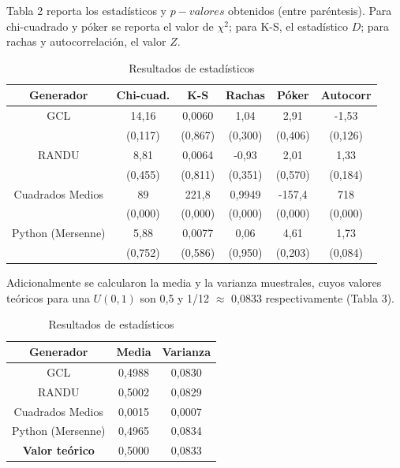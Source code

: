 \documentclass{article}
\begin{document}
Tabla 2 reporta los estadísticos y $p-valores$ obtenidos (entre paréntesis).
Para chi-cuadrado y póker se reporta el valor de $\chi^2$; para K-S, el estadístico $D$; para rachas y autocorrelación, el valor $Z$.

\begin{table}[H]
\begin{center}
\begin{tabular}{ c  c  c  c  c  c }
Generador & Chi-cuad. & K-S & Rachas & Póker & Autocorr \\
\hline
GCL & 14,16 & 0,0060 & 1,04 & 2,91 & -1,53 \\
 & (0,117) & (0,867) & (0,300) & (0,406) & (0,126) \\
RANDU & 8,81 & 0,0064 & -0,93 & 2,01 & 1,33 \\
 & (0,455) & (0,811) & (0,351) & (0,570) & (0,184) \\
Cuadrados Medios & 89 & 221,8 & 0,9949 & -157,4 & 718 \\
 & (0,000) & (0,000) & (0,000) & (0,000) & (0,000) \\
Python (Mersenne) & 5,88 & 0,0077 & 0,06 & 4,61 & 1,73 \\
 & (0,752) & (0,586) & (0,950) & (0,203) & (0,084) \\
\hline
\end{tabular}
\caption{Resultados de estadísticos}
\end{center}
\end{table}



Adicionalmente se calcularon la media y la varianza muestrales, cuyos valores teóricos para una $U(0, 1)$ son 0,5 y 1/12 \(\approx\) 0,0833 respectivamente (Tabla 3).
\begin{table}[H]
\begin{center}
\begin{tabular}{ c  c  c }
Generador & Media & Varianza \\
\hline
GCL & 0,4988 & 0,0830 \\
RANDU & 0,5002 & 0,0829 \\
Cuadrados Medios & 0,0015 & 0,0007 \\
Python (Mersenne) & 0,4965 & 0,0834 \\
\hline
\textbf{Valor teórico} & 0,5000 & 0,0833 \\
\hline
\end{tabular}
\caption{Resultados de estadísticos}
\end{center}
\end{table}
\end{document}
